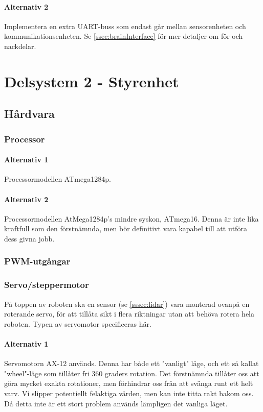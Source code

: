 \documentclass[a4paper,11pt]{article}
\begin{document}
\paragraph{Alternativ 2}
Implementera en extra UART-buss som endast går mellan sensorenheten och kommunikationsenheten. Se \ref{ssec:brainInterface} för mer detaljer om för och nackdelar.

\section{Delsystem 2 - Styrenhet}

\subsection{Hårdvara}

\subsubsection{Processor}

\paragraph{Alternativ 1}
Processormodellen ATmega1284p.

\paragraph{Alternativ 2}
Processormodellen AtMega1284p's mindre syskon, ATmega16. Denna är inte lika kraftfull som den förstnämnda, men bör definitivt vara kapabel till att utföra dess givna jobb.

\subsubsection{PWM-utgångar}

\subsubsection{Servo/steppermotor} \label{ssec:servomotor}
På toppen av roboten ska en sensor (se \ref{sssec:lidar}) vara monterad ovanpå en roterande servo, för att tillåta sikt i flera riktningar utan att behöva rotera hela roboten. Typen av servomotor specificeras här.

\paragraph{Alternativ 1}
Servomotorn AX-12 används. Denna har både ett "vanligt" läge, och ett så kallat "wheel"-läge som tillåter fri 360 graders rotation. Det förstnämnda tillåter oss att göra mycket exakta rotationer, men förhindrar oss från att svänga runt ett helt varv. Vi slipper potentiellt felaktiga värden, men kan inte titta rakt bakom oss. Då detta inte är ett stort problem används lämpligen det vanliga läget.
\end{document}
